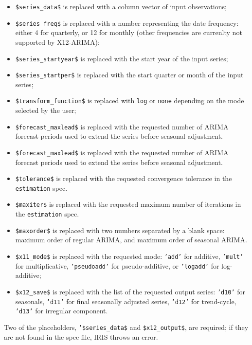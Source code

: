 \begin{itemize}
\itemsep1pt\parskip0pt
\item
  \texttt{\$series\_data\$} is replaced with a column vector of input
  observations;
\item
  \texttt{\$series\_freq\$} is replaced with a number representing the
  date frequency: either 4 for quarterly, or 12 for monthly (other
  frequencies are currenlty not supported by X12-ARIMA);
\item
  \texttt{\$series\_startyear\$} is replaced with the start year of the
  input series;
\item
  \texttt{\$series\_startper\$} is replaced with the start quarter or
  month of the input series;
\item
  \texttt{\$transform\_function\$} is replaced with \texttt{log} or
  \texttt{none} depending on the mode selected by the user;
\item
  \texttt{\$forecast\_maxlead\$} is replaced with the requested number
  of ARIMA forecast periods used to extend the series before seasonal
  adjustment.
\item
  \texttt{\$forecast\_maxlead\$} is replaced with the requested number
  of ARIMA forecast periods used to extend the series before seasonal
  adjustment.
\item
  \texttt{\$tolerance\$} is replaced with the requested convergence
  tolerance in the \texttt{estimation} spec.
\item
  \texttt{\$maxiter\$} is replaced with the requested maximum number of
  iterations in the \texttt{estimation} spec.
\item
  \texttt{\$maxorder\$} is replaced with two numbers separated by a
  blank space: maximum order of regular ARIMA, and maximum order of
  seasonal ARIMA.
\item
  \texttt{\$x11\_mode\$} is replaced with the requested mode:
  \texttt{'add'} for additive, \texttt{'mult'} for multiplicative,
  \texttt{'pseudoadd'} for pseudo-additive, or \texttt{'logadd'} for
  log-additive;
\item
  \texttt{\$x12\_save\$} is replaced with the list of the requested
  output series: \texttt{'d10'} for seasonals, \texttt{'d11'} for final
  seasonally adjusted series, \texttt{'d12'} for trend-cycle,
  \texttt{'d13'} for irregular component.
\end{itemize}

Two of the placeholders, \texttt{'\$series\_data\$} and
\texttt{\$x12\_output\$}, are required; if they are not found in the
spec file, IRIS throws an error.

